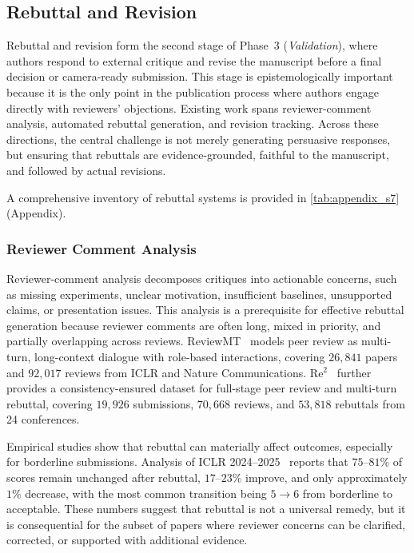 \subsection{Rebuttal and Revision}
\label{sec:rebuttal}

Rebuttal and revision form the second stage of Phase~3 (\emph{Validation}), where authors respond to external critique and revise the manuscript before a final decision or camera-ready submission. This stage is epistemologically important because it is the only point in the publication process where authors engage directly with reviewers' objections. Existing work spans reviewer-comment analysis, automated rebuttal generation, and revision tracking. Across these directions, the central challenge is not merely generating persuasive responses, but ensuring that rebuttals are evidence-grounded, faithful to the manuscript, and followed by actual revisions.

A comprehensive inventory of rebuttal systems is provided in \cref{tab:appendix_s7} (Appendix).



\subsubsection{Reviewer Comment Analysis}
\label{sec:rebuttal_analysis}

Reviewer-comment analysis decomposes critiques into actionable concerns, such as missing experiments, unclear motivation, insufficient baselines, unsupported claims, or presentation issues. This analysis is a prerequisite for effective rebuttal generation because reviewer comments are often long, mixed in priority, and partially overlapping across reviews. ReviewMT~\cite{reviewmt2024} models peer review as multi-turn, long-context dialogue with role-based interactions, covering $26{,}841$ papers and $92{,}017$ reviews from ICLR and Nature Communications. Re$^2$~\cite{re2dataset2025} further provides a consistency-ensured dataset for full-stage peer review and multi-turn rebuttal, covering $19{,}926$ submissions, $70{,}668$ reviews, and $53{,}818$ rebuttals from 24 conferences.

Empirical studies show that rebuttal can materially affect outcomes, especially for borderline submissions. Analysis of ICLR 2024--2025~\cite{iclr_rebuttal2025} reports that $75$--$81\%$ of scores remain unchanged after rebuttal, $17$--$23\%$ improve, and only approximately $1\%$ decrease, with the most common transition being $5 \rightarrow 6$ from borderline to acceptable. These numbers suggest that rebuttal is not a universal remedy, but it is consequential for the subset of papers where reviewer concerns can be clarified, corrected, or supported with additional evidence.



